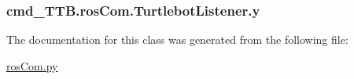 \subsubsection[{\texorpdfstring{y}{y}}]{\setlength{\rightskip}{0pt plus 5cm}cmd\+\_\+\+T\+T\+B.\+ros\+Com.\+Turtlebot\+Listener.\+y}\hypertarget{classcmd__TTB_1_1rosCom_1_1TurtlebotListener_a65dcdf893e0634569fb6ef82ee2b994b}{}\label{classcmd__TTB_1_1rosCom_1_1TurtlebotListener_a65dcdf893e0634569fb6ef82ee2b994b}


The documentation for this class was generated from the following file\+:\begin{DoxyCompactItemize}
\item 
\hyperlink{rosCom_8py}{ros\+Com.\+py}\end{DoxyCompactItemize}
